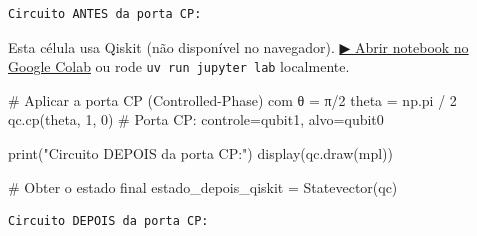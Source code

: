 \documentclass[
  brazilian,
]{report}
\newenvironment{Shaded}{\begin{snugshade}}{\end{snugshade}}
\newcommand{\BuiltInTok}[1]{\textcolor[rgb]{0.00,0.23,0.31}{#1}}
\newcommand{\CommentTok}[1]{\textcolor[rgb]{0.37,0.37,0.37}{#1}}
\newcommand{\DecValTok}[1]{\textcolor[rgb]{0.68,0.00,0.00}{#1}}
\newcommand{\NormalTok}[1]{\textcolor[rgb]{0.00,0.23,0.31}{#1}}
\newcommand{\OperatorTok}[1]{\textcolor[rgb]{0.37,0.37,0.37}{#1}}
\newcommand{\StringTok}[1]{\textcolor[rgb]{0.13,0.47,0.30}{#1}}
\begin{document}
\begin{verbatim}
Circuito ANTES da porta CP:
\end{verbatim}

\begin{tcolorbox}[enhanced jigsaw, arc=.35mm, bottomrule=.15mm, bottomtitle=1mm, breakable, colback=white, colbacktitle=quarto-callout-warning-color!10!white, colframe=quarto-callout-warning-color-frame, coltitle=black, left=2mm, leftrule=.75mm, opacityback=0, opacitybacktitle=0.6, rightrule=.15mm, title=\textcolor{quarto-callout-warning-color}{\faExclamationTriangle}\hspace{0.5em}{⚛️ Célula Qiskit --- execute no Colab ou localmente}, titlerule=0mm, toprule=.15mm, toptitle=1mm]

Esta célula usa Qiskit (não disponível no navegador).
\href{https://colab.research.google.com/github/maxwellamaral/aula-quantum/blob/main/notebooks/00b-phases.ipynb}{▶
Abrir notebook no Google Colab} ou rode \texttt{uv\ run\ jupyter\ lab}
localmente.

\begin{Shaded}
\begin{Highlighting}[]

\CommentTok{\# Aplicar a porta CP (Controlled{-}Phase) com θ = π/2}
\NormalTok{theta }\OperatorTok{=}\NormalTok{ np.pi }\OperatorTok{/} \DecValTok{2}
\NormalTok{qc.cp(theta, }\DecValTok{1}\NormalTok{, }\DecValTok{0}\NormalTok{)  }\CommentTok{\# Porta CP: controle=qubit1, alvo=qubit0}

\BuiltInTok{print}\NormalTok{(}\StringTok{"Circuito DEPOIS da porta CP:"}\NormalTok{)}
\NormalTok{display(qc.draw(}\StringTok{\textquotesingle{}mpl\textquotesingle{}}\NormalTok{))}

\CommentTok{\# Obter o estado final}
\NormalTok{estado\_depois\_qiskit }\OperatorTok{=}\NormalTok{ Statevector(qc)}
\end{Highlighting}
\end{Shaded}

\end{tcolorbox}

\begin{verbatim}
Circuito DEPOIS da porta CP:
\end{verbatim}
\end{document}
